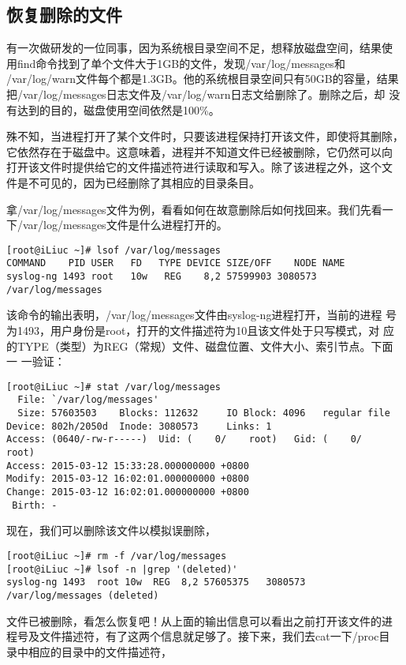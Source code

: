 \subsection{恢复删除的文件}

有一次做研发的一位同事，因为系统根目录空间不足，想释放磁盘空间，结果使
用find命令找到了单个文件大于1GB的文件，发现/var/log/messages和
/var/log/warn文件每个都是1.3GB。他的系统根目录空间只有50GB的容量，结果
把/var/log/messages日志文件及/var/log/warn日志文给删除了。删除之后，却
没有达到的目的，磁盘使用空间依然是100\%。

殊不知，当进程打开了某个文件时，只要该进程保持打开该文件，即使将其删除，
它依然存在于磁盘中。这意味着，进程并不知道文件已经被删除，它仍然可以向
打开该文件时提供给它的文件描述符进行读取和写入。除了该进程之外，这个文
件是不可见的，因为已经删除了其相应的目录条目。

拿/var/log/messages文件为例，看看如何在故意删除后如何找回来。我们先看一
下/var/log/messages文件是什么进程打开的。

\begin{verbatim}
[root@iLiuc ~]# lsof /var/log/messages 
COMMAND    PID USER   FD   TYPE DEVICE SIZE/OFF    NODE NAME
syslog-ng 1493 root   10w   REG    8,2 57599903 3080573 /var/log/messages
\end{verbatim}

该命令的输出表明，/var/log/messages文件由syslog-ng进程打开，当前的进程
号为1493，用户身份是root，打开的文件描述符为10且该文件处于只写模式，对
应的TYPE（类型）为REG（常规）文件、磁盘位置、文件大小、索引节点。下面一
一验证：

\begin{verbatim}
[root@iLiuc ~]# stat /var/log/messages 
  File: `/var/log/messages'
  Size: 57603503  	Blocks: 112632     IO Block: 4096   regular file
Device: 802h/2050d	Inode: 3080573     Links: 1
Access: (0640/-rw-r-----)  Uid: (    0/    root)   Gid: (    0/    root)
Access: 2015-03-12 15:33:28.000000000 +0800
Modify: 2015-03-12 16:02:01.000000000 +0800
Change: 2015-03-12 16:02:01.000000000 +0800
 Birth: -
\end{verbatim}

现在，我们可以删除该文件以模拟误删除，

\begin{verbatim}
[root@iLiuc ~]# rm -f /var/log/messages
[root@iLiuc ~]# lsof -n |grep '(deleted)'
syslog-ng 1493  root 10w  REG  8,2 57605375   3080573 /var/log/messages (deleted)
\end{verbatim}

文件已被删除，看怎么恢复吧！从上面的输出信息可以看出之前打开该文件的进
程号及文件描述符，有了这两个信息就足够了。接下来，我们去cat一下/proc目
录中相应的目录中的文件描述符，

